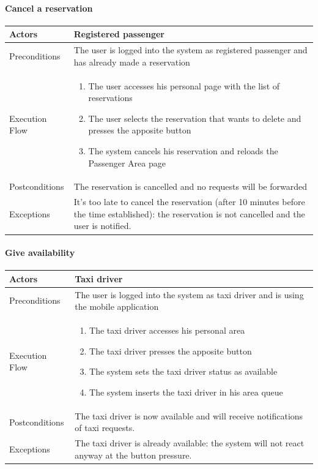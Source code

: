 		\paragraph{Cancel a reservation}
			\begin{center}
				\begin{tabular}{ | l | p{8cm} |}
					\hline Actors & Registered passenger
					\\ \hline
					Preconditions &
					The user is logged into the system as registered passenger and has already made
					a reservation
					\\ \hline
					Execution Flow &
					\begin{enumerate}
						\item The user accesses his personal page with the list of reservations
						\item The user selects the reservation that wants to delete and presses the apposite
						button
						\item The system cancels his reservation and reloads the Passenger Area page
					\end{enumerate}
					\\ \hline
					Postconditions & The reservation is cancelled and no requests will be forwarded
					\\ \hline
					Exceptions &
					It's too late to cancel the reservation (after 10 minutes before the time established):
					the reservation is not cancelled and the user is notified.
					\\ \hline
				\end{tabular}
			\end{center}
		\paragraph{Give availability}
			\begin{center}
				\begin{tabular}{ | l | p{8cm} |}
					\hline Actors & Taxi driver
					\\ \hline
					Preconditions &
					The user is logged into the system as taxi driver and is using the mobile application
					\\ \hline
					Execution Flow &
					\begin{enumerate}
						\item The taxi driver accesses his personal area
						\item The taxi driver presses the apposite button
						\item The system sets the taxi driver status as available
						\item The system inserts the taxi driver in his area queue
					\end{enumerate}
					\\ \hline
					Postconditions & 
					The taxi driver is now available and will receive notifications of taxi requests.
					\\ \hline
					Exceptions &
					The taxi driver is already available: the system will not react anyway at the button
					pressure.
					\\ \hline
				\end{tabular}
			\end{center}
